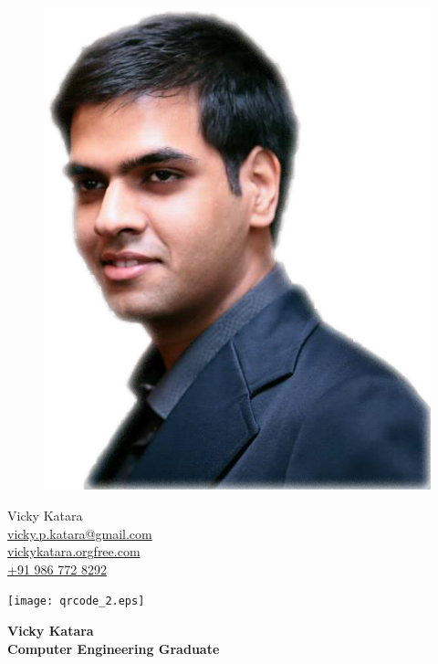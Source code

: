 \documentclass[a4paper,12pt,final]{memoir}
\begin{document}
\begin{figure}
	\hfill
	\includegraphics[width=0.8\columnwidth]{kkk}
	\vspace{-5cm}
\end{figure}

\begin{flushright} 
	Vicky Katara \\
	\footnotesize
	\href{mailto:vicky.p.katara@gmail.com}{vicky.p.katara@gmail.com}\\
	\href{http://vickykatara.orgfree.com/}{vickykatara.orgfree.com}\\
	\href{tel:+919867728292}{+91 986 772 8292}
\end{flushright}\normalsize
	\vspace{-0.5cm}
	\hspace{0.5cm}
	\texttt{[image: qrcode\_2.eps]}

\framebreak



\Huge\bfseries {\color{Plum} Vicky Katara} \\
\Large\bfseries  Computer Engineering Graduate \\
\end{document}
